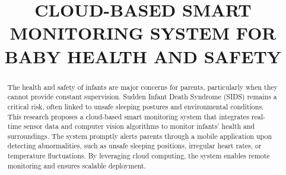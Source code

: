 \documentclass[conference]{IEEEtran}
\begin{document}
\title{CLOUD-BASED SMART MONITORING SYSTEM
FOR BABY HEALTH AND SAFETY
}
\author{
\and
{}
\and 
{}
\and
{}
\and
{}
}

\maketitle

\begin{abstract}
    The health and safety of infants are major concerns for parents, particularly when they cannot provide constant supervision. Sudden Infant Death Syndrome (SIDS) remains a critical risk, often linked to unsafe sleeping postures and environmental conditions. This research proposes a cloud-based smart monitoring system that integrates real-time sensor data and computer vision algorithms to monitor infants’ health and surroundings. The system promptly alerts parents through a mobile application upon detecting abnormalities, such as unsafe sleeping positions, irregular heart rates, or temperature fluctuations. By leveraging cloud computing, the system enables remote monitoring and ensures scalable deployment.
    \end{abstract}
    
\end{document}
